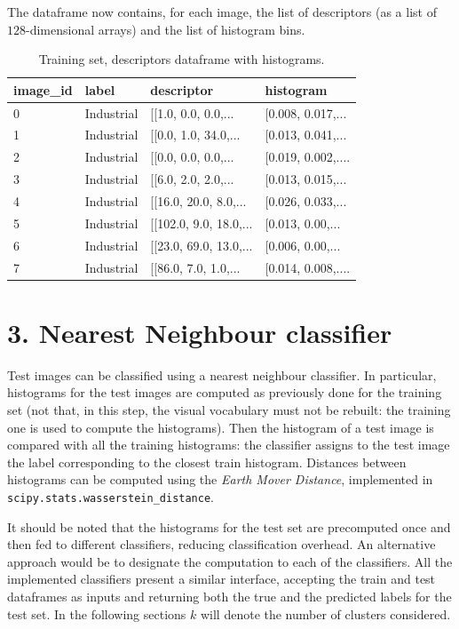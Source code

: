 \documentclass[12pt]{article}
\begin{document}
  The dataframe now contains, for each image, the list of descriptors (as a list of \( 128 \)-dimensional arrays) and the list of histogram bins.

	\begin{table}[H] 
		\centering
		\caption*{Training set, descriptors dataframe with histograms.}
		\begin{tabular}{llll}
			\toprule
      image\_id & label & descriptor & histogram \\
      \midrule
      0 &  Industrial &  [[1.0, 0.0, 0.0,...    &  [0.008, 0.017,... \\
      1 &  Industrial &  [[0.0, 1.0, 34.0,...   &  [0.013, 0.041,... \\
      2 &  Industrial &  [[0.0, 0.0, 0.0,...    &  [0.019, 0.002,.... \\
      3 &  Industrial &  [[6.0, 2.0, 2.0,...    &  [0.013, 0.015,... \\
      4 &  Industrial &  [[16.0, 20.0, 8.0,...  &  [0.026, 0.033,... \\
      5 &  Industrial &  [[102.0, 9.0, 18.0,... &  [0.013, 0.00,... \\
      6 &  Industrial &  [[23.0, 69.0, 13.0,... &  [0.006, 0.00,... \\
      7 &  Industrial &  [[86.0, 7.0, 1.0,...   &  [0.014, 0.008,.... \\
			\bottomrule
		\end{tabular}
	\end{table}


  \section*{3. Nearest Neighbour classifier}

  Test images can be classified using a nearest neighbour classifier. In particular, histograms for the test images are computed as previously done for the training set (not that, in this step, the visual vocabulary must not be rebuilt: the training one is used to compute the histograms). Then the histogram of a test image is compared with all the training histograms: the classifier assigns to the test image the label corresponding to the closest train histogram. Distances between histograms can be computed using the \textit{Earth Mover Distance}, implemented in \texttt{scipy.stats.wasserstein\_distance}.
  
  It should be noted that the histograms for the test set are precomputed once and then fed to different classifiers, reducing classification overhead. An alternative approach would be to designate the computation to each of the classifiers. All the implemented classifiers present a similar interface, accepting the train and test dataframes as inputs and returning both the true and the predicted labels for the test set. In the following sections \( k \) will denote the number of clusters considered.
\end{document}

